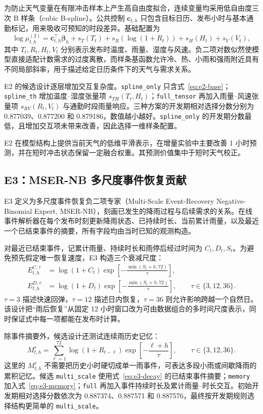 \documentclass[UTF8,11pt,a4paper]{ctexart}
\begin{document}
为防止天气变量在有限冲击样本上产生高自由度拟合，连续变量均采用低自由度三次 B 样条（cubic B-spline）。公共控制 $\bm c_{t,h}$ 只包含目标日历、发布小时与基本通勤标记，用来吸收可预知的时段差异。基础配置为
\begin{equation}
  \log\mu^{(2)}_{t,h}=\bm c_{t,h}^{\top}\bm\beta_h
  +s_T(T_t)+s_R\!\left(\log(1+R_t)\right)+s_H(H_t)+s_V(V_t),
  \label{eq:e2-base}
\end{equation}
其中 $T_t,R_t,H_t,V_t$ 分别表示发布时温度、雨量、湿度与风速。负二项对数似然使模型直接适配计数需求的过度离散，而样条基函数允许冷、热、小雨和强雨附近具有不同局部斜率，用于描述给定日历条件下的天气与需求关系。

E2 的候选设计逐层增加交互复杂度。\texttt{spline\_only} 只含式~\eqref{eq:e2-base}；\texttt{spline\_th} 增加温度--湿度张量项 $s_{TH}(T_t,H_t)$；\texttt{full\_tensor} 再加入雨量--风速张量项 $s_{RV}(R_t,V_t)$ 与通勤时段雨量响应。三种方案的开发期相对选择分数分别为 0.877039、0.877200 和 0.879186，数值越小越好。\texttt{spline\_only} 的开发期分数最低，且增加交互项未带来改善，因此选择一维样条配置。

E2 在模型结构上提供当前天气的低维平滑表示，在增量实验中主要改善 1 小时预测，并在短时冲击状态保留一定融合权重。其预测价值集中于短时天气校正。

\subsection{E3：MSER-NB 多尺度事件恢复贡献}

E3 定义为多尺度事件恢复负二项专家（Multi-Scale Event-Recovery Negative-Binomial Expert, MSER-NB），刻画已发生的降雨过程与后续需求的关系。在线事件解析器在每个发布时刻更新降雨状态、已持续时长、当前累计雨量，以及最近一个已结束事件的摘要，所有字段均由当时已知的观测构造。

对最近已结束事件，记累计雨量、持续时长和雨停后经过时间为 $C_t,D_t,S_t$。为避免预先假定唯一恢复速度，E3 构造三个衰减尺度：
\begin{align}
  E^{C,\tau}_{t,h}&=\log(1+C_t)\exp\!\left[-\frac{\min(S_t+h,72)}{\tau}\right],\\
  E^{D,\tau}_{t,h}&=\log(1+D_t)\exp\!\left[-\frac{\min(S_t+h,72)}{\tau}\right],
  \qquad \tau\in\{3,12,36\}.
  \label{eq:e3-decay}
\end{align}
$\tau=3$ 描述快速回弹，$\tau=12$ 描述日内恢复，$\tau=36$ 则允许影响跨越一个自然日。该设计把“雨后恢复”从固定 12 小时窗口改为可由数据组合的多时间尺度表示，同时保证式中每一项都能在发布时计算。

除事件摘要外，候选设计还测试连续雨历史记忆：
\begin{equation}
  M^{\tau}_{t,h}=\sum_{\ell=1}^{72}\log(1+R_{t-\ell})
  \exp\!\left[-\frac{\ell+h}{\tau}\right],
  \qquad \tau\in\{3,12,36\}.
  \label{eq:e3-memory}
\end{equation}
这里的 $M^{\tau}_{t,h}$ 不需要把历史小时硬切成单一雨事件，可表达多段小雨或间歇降雨的累积记忆。候选 \texttt{multi\_scale} 使用式~\eqref{eq:e3-decay} 的已结束事件摘要；\texttt{memory} 加入式~\eqref{eq:e3-memory}；\texttt{full} 再加入事件持续时长及累计雨量--时长交互。初始开发期相对选择分数依次为 0.887374、0.887571 和 0.887576，最终按开发期规则选择结构更简单的 \texttt{multi\_scale}。
\end{document}
